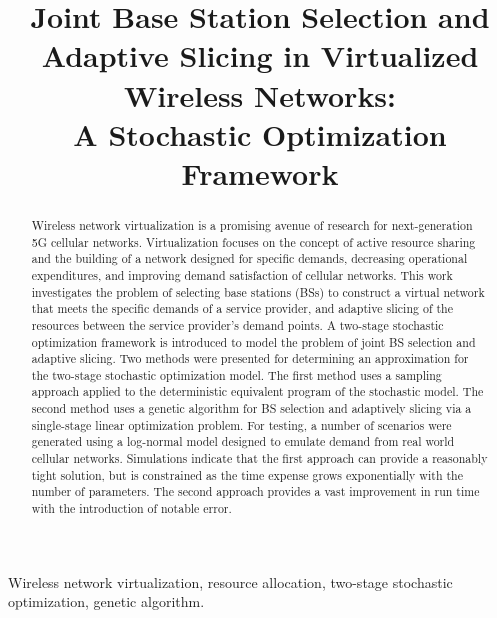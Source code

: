 \documentclass[conference]{IEEEtran}
\begin{document}
\title{Joint Base Station Selection and Adaptive Slicing in Virtualized Wireless Networks:\\A Stochastic Optimization Framework}

\author{
}

\maketitle

\begin{abstract}
Wireless network virtualization is a promising avenue of research for next-generation 5G cellular networks.  Virtualization focuses on the concept of active resource sharing and the building of a network designed for specific demands, decreasing operational expenditures, and improving demand satisfaction of cellular networks.  This work investigates the problem of selecting base stations (BSs) to construct a virtual network that meets the specific demands of a service provider, and adaptive slicing of the resources between the service provider's demand points.  A two-stage stochastic optimization framework is introduced to model the problem of joint BS selection and adaptive slicing.  Two methods were presented for determining an approximation for the two-stage stochastic optimization model.  The first method uses a sampling approach applied to the deterministic equivalent program of the stochastic model.  The second method uses a genetic algorithm for BS selection and adaptively slicing via a single-stage linear optimization problem.  For testing, a number of scenarios were generated using a log-normal model designed to emulate demand from real world cellular networks.  Simulations indicate that the first approach can provide a reasonably tight solution, but is constrained as the time expense grows exponentially with the number of parameters.  The second approach provides a vast improvement in run time with the introduction of notable error.
\end{abstract}

\begin{IEEEkeywords}
Wireless network virtualization, resource allocation, two-stage stochastic optimization, genetic algorithm.
\end{IEEEkeywords}
\end{document}

